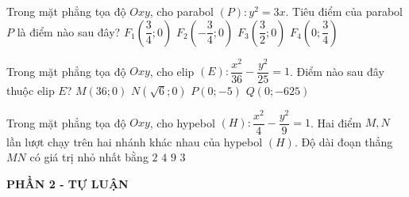 \begin{ex}%
	Trong mặt phẳng tọa độ $Oxy$, cho parabol $(P)\colon y^2=3 x$. Tiêu điểm của parabol $P$ là điểm nào sau đây?
	\choice
	{\True $F_1\left(\dfrac{3}{4} ; 0\right)$}
	{$F_2\left(-\dfrac{3}{4} ; 0\right)$}
	{$F_3\left(\dfrac{3}{2} ; 0\right)$}
	{$F_4\left(0 ; \dfrac{3}{4}\right)$}
\end{ex}
\begin{ex}%
	Trong mặt phẳng tọa độ $O x y$, cho elip $(E)\colon \dfrac{x^2}{36}-\dfrac{y^2}{25}=1$. Điểm nào sau đây thuộc elip $E$?
	\choice
	{$M(36;0)$}
	{$N(\sqrt{6};0)$}
	{\True $P(0;-5)$}
	{$Q(0;-625)$}
\end{ex}
\begin{ex}%
	Trong mặt phẳng tọa độ $O x y$, cho hypebol $(H)\colon \dfrac{x^2}{4}-\dfrac{y^2}{9}=1$. Hai điểm $M, N$ lần lượt chạy trên hai nhánh khác nhau của hypebol $(H)$. Độ dài đoạn thẳng $M N$ có giá trị nhỏ nhất bằng
	\choice
	{$2$}
	{\True $4$}
	{$9$}
	{$3$}
\end{ex}




\begin{center}
	\textbf{PHẦN 2 - TỰ LUẬN}
\end{center}


